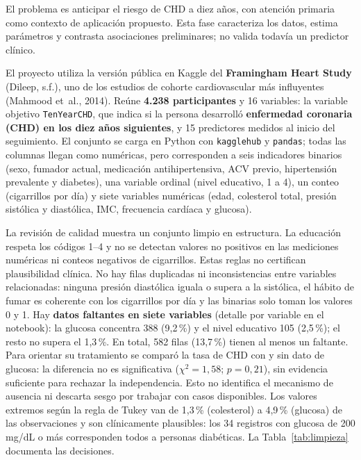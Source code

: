 \documentclass[11pt,a4paper]{article}
\begin{document}
El problema es anticipar el riesgo de CHD a diez años, con atención primaria como contexto de
aplicación propuesto. Esta fase caracteriza los datos, estima parámetros y contrasta asociaciones
preliminares; no valida todavía un predictor clínico.

El proyecto utiliza la versión pública en Kaggle del \textbf{Framingham Heart Study} (Dileep, s.f.),
uno de los estudios de cohorte cardiovascular más influyentes (Mahmood et~al., 2014). Reúne
\textbf{4.238 participantes} y 16 variables: la variable objetivo \texttt{TenYearCHD}, que indica si la
persona desarrolló \textbf{enfermedad coronaria (CHD) en los diez años siguientes}, y 15 predictores
medidos al inicio del seguimiento. El conjunto se carga en Python con \texttt{kagglehub} y
\texttt{pandas}; todas las columnas llegan como numéricas, pero corresponden a seis indicadores binarios
(sexo, fumador actual, medicación antihipertensiva, ACV previo, hipertensión prevalente y diabetes), una
variable ordinal (nivel educativo, 1 a 4), un conteo (cigarrillos por día) y siete variables numéricas
(edad, colesterol total, presión sistólica y diastólica, IMC, frecuencia cardíaca y glucosa).

La revisión de calidad muestra un conjunto limpio en estructura. La educación respeta los códigos 1--4 y no se detectan valores no positivos en las mediciones
numéricas ni conteos negativos de cigarrillos. Estas reglas no certifican plausibilidad clínica. No hay filas duplicadas ni
inconsistencias entre variables relacionadas: ninguna presión diastólica iguala o supera a la sistólica,
el hábito de fumar es coherente con los cigarrillos por día y las binarias solo toman los valores 0 y 1.
Hay \textbf{datos faltantes en siete variables} (detalle por variable en el notebook): la glucosa concentra 388
(9{,}2\,\%) y el nivel educativo 105 (2{,}5\,\%); el resto no supera el 1{,}3\,\%. En total, 582 filas
(13{,}7\,\%) tienen al menos un faltante. Para orientar su tratamiento se comparó la tasa de CHD con y sin
dato de glucosa: la diferencia no es significativa ($\chi^2=1{,}58$; $p=0{,}21$), sin evidencia suficiente para rechazar la independencia. Esto no identifica el mecanismo de
ausencia ni descarta sesgo por trabajar con casos disponibles. Los valores extremos según la regla de Tukey van de 1{,}3\,\%
(colesterol) a 4{,}9\,\% (glucosa) de las observaciones y son clínicamente plausibles: los 34 registros con
glucosa de 200 mg/dL o más corresponden todos a personas diabéticas. La Tabla~\ref{tab:limpieza}
documenta las decisiones.
\end{document}
